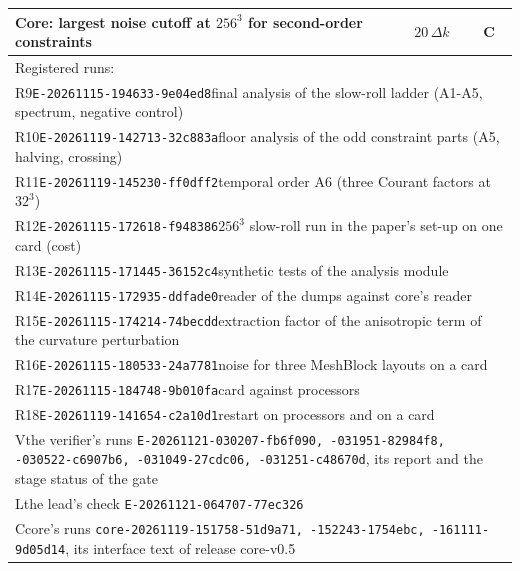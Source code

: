 \begin{table}
\begin{ruledtabular}
\begin{tabular}{p{}p{}p{}}
Core: largest noise cutoff at $256^3$ for second-order constraints & $20\,\Delta k$ & C \\
\hline
\multicolumn{3}{l}{Registered runs:} \\
\multicolumn{3}{l}{R9\quad\texttt{E-20261115-194633-9e04ed8}\quad final analysis of the slow-roll ladder (A1-A5, spectrum, negative control)} \\
\multicolumn{3}{l}{R10\quad\texttt{E-20261119-142713-32c883a}\quad floor analysis of the odd constraint parts (A5, halving, crossing)} \\
\multicolumn{3}{l}{R11\quad\texttt{E-20261119-145230-ff0dff2}\quad temporal order A6 (three Courant factors at $32^3$)} \\
\multicolumn{3}{l}{R12\quad\texttt{E-20261115-172618-f948386}\quad $256^3$ slow-roll run in the paper's set-up on one card (cost)} \\
\multicolumn{3}{l}{R13\quad\texttt{E-20261115-171445-36152c4}\quad synthetic tests of the analysis module} \\
\multicolumn{3}{l}{R14\quad\texttt{E-20261115-172935-ddfade0}\quad reader of the dumps against core's reader} \\
\multicolumn{3}{l}{R15\quad\texttt{E-20261115-174214-74becdd}\quad extraction factor of the anisotropic term of the curvature perturbation} \\
\multicolumn{3}{l}{R16\quad\texttt{E-20261115-180533-24a7781}\quad noise for three MeshBlock layouts on a card} \\
\multicolumn{3}{l}{R17\quad\texttt{E-20261115-184748-9b010fa}\quad card against processors} \\
\multicolumn{3}{l}{R18\quad\texttt{E-20261119-141654-c2a10d1}\quad restart on processors and on a card} \\
\multicolumn{3}{p{0.93\textwidth}}{V\quad the verifier's runs \texttt{E-20261121-030207-fb6f090, -031951-82984f8, -030522-c6907b6, -031049-27cdc06, -031251-c48670d}, its report and the stage status of the gate} \\
\multicolumn{3}{l}{L\quad the lead's check \texttt{E-20261121-064707-77ec326}} \\
\multicolumn{3}{p{0.93\textwidth}}{C\quad core's runs \texttt{core-20261119-151758-51d9a71, -152243-1754ebc, -161111-9d05d14}, its interface text of release core-v0.5} \\
\end{tabular}
\end{ruledtabular}
\end{table}
